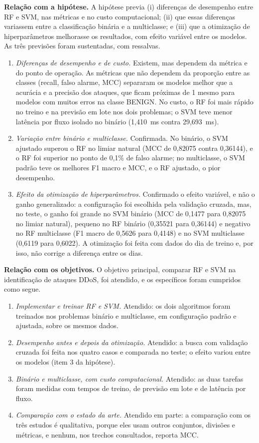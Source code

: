 \documentclass[
    12pt,                %
    openright,           %
    oneside,             %
    a4paper,             %
    english,             %
    brazil               %
]{abntex2}
\begin{document}
\textbf{Relação com a hipótese.} A hipótese previa (i) diferenças de desempenho entre RF e SVM, nas métricas e no custo computacional; (ii) que essas diferenças variassem entre a classificação binária e a multiclasse; e (iii) que a otimização de hiperparâmetros melhorasse os resultados, com efeito variável entre os modelos. As três previsões foram sustentadas, com ressalvas.
\begin{enumerate}
\item \textit{Diferenças de desempenho e de custo.} Existem, mas dependem da métrica e do ponto de operação. As métricas que não dependem da proporção entre as classes (recall, falso alarme, MCC) separaram os modelos melhor que a acurácia e a precisão dos ataques, que ficam próximas de 1 mesmo para modelos com muitos erros na classe BENIGN. No custo, o RF foi mais rápido no treino e na previsão em lote nos dois problemas; o SVM teve menor latência por fluxo isolado no binário (1,410~ms contra 29,693~ms).
\item \textit{Variação entre binário e multiclasse.} Confirmada. No binário, o SVM ajustado superou o RF no limiar natural (MCC de 0,82075 contra 0,36144), e o RF foi superior no ponto de 0,1\% de falso alarme; no multiclasse, o SVM padrão teve os melhores F1 macro e MCC, e o RF ajustado, o pior desempenho.
\item \textit{Efeito da otimização de hiperparâmetros.} Confirmado o efeito variável, e não o ganho generalizado: a configuração foi escolhida pela validação cruzada, mas, no teste, o ganho foi grande no SVM binário (MCC de 0,1477 para 0,82075 no limiar natural), pequeno no RF binário (0,35521 para 0,36144) e negativo no RF multiclasse (F1 macro de 0,5626 para 0,4148) e no SVM multiclasse (0,6119 para 0,6022). A otimização foi feita com dados do dia de treino e, por isso, não corrige a diferença entre os dias.
\end{enumerate}
\textbf{Relação com os objetivos.} O objetivo principal, comparar RF e SVM na identificação de ataques DDoS, foi atendido, e os específicos foram cumpridos como segue.
\begin{enumerate}
\item \textit{Implementar e treinar RF e SVM.} Atendido: os dois algoritmos foram treinados nos problemas binário e multiclasse, em configuração padrão e ajustada, sobre os mesmos dados.
\item \textit{Desempenho antes e depois da otimização.} Atendido: a busca com validação cruzada foi feita nos quatro casos e comparada no teste; o efeito variou entre os modelos (item 3 da hipótese).
\item \textit{Binário e multiclasse, com custo computacional.} Atendido: as duas tarefas foram medidas com tempos de treino, de previsão em lote e de latência por fluxo.
\item \textit{Comparação com o estado da arte.} Atendido em parte: a comparação com os três estudos é qualitativa, porque eles usam outros conjuntos, divisões e métricas, e nenhum, nos trechos consultados, reporta MCC.
\end{enumerate}
\end{document}
